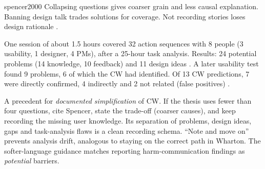 \begin{papercard}{spencer2000}
 Collapsing questions gives coarser grain and less causal explanation. Banning design talk trades solutions for coverage. Not recording stories loses design rationale .

 One session of about 1.5 hours covered 32 action sequences with 8 people (3 usability, 1 designer, 4 PMs), after a 25-hour task analysis. Results: 24 potential problems (14 knowledge, 10 feedback) and 11 design ideas . A later usability test found 9 problems, 6 of which the CW had identified. Of 13 CW predictions, 7 were directly confirmed, 4 indirectly and 2 not related (false positives) .

 A precedent for \emph{documented simplification} of CW. If the thesis uses fewer than four questions, cite Spencer, state the trade-off (coarser causes), and keep recording the missing user knowledge. Its separation of problems, design ideas, gaps and task-analysis flaws is a clean recording schema. ``Note and move on'' prevents analysis drift, analogous to staying on the correct path in Wharton. The softer-language guidance matches reporting harm-communication findings as \emph{potential} barriers.
\end{papercard}
